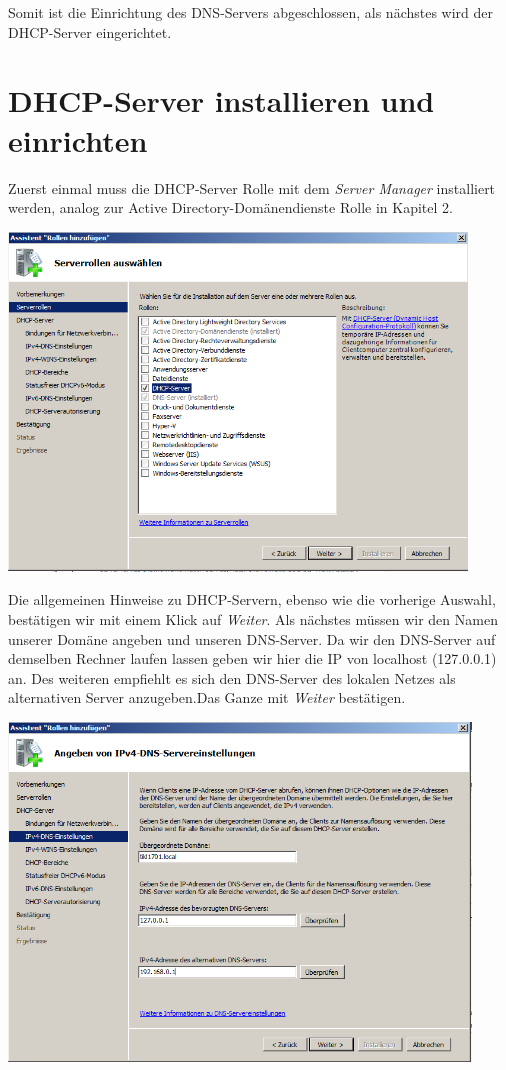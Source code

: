 \documentclass[12pt,a4paper,titlepage]{scrartcl} %
\begin{document}
Somit ist die Einrichtung des DNS-Servers abgeschlossen, als nächstes wird der DHCP-Server eingerichtet.

\newpage
\section{DHCP-Server installieren und einrichten}
Zuerst einmal muss die DHCP-Server Rolle mit dem \emph{Server Manager} installiert werden, analog zur Active Directory-Domänendienste Rolle in Kapitel 2.\\

	\begin{center}\includegraphics[height=9cm]{Bilder/039(DHCP01)}\\ \end{center}

Die allgemeinen Hinweise zu DHCP-Servern, ebenso wie die vorherige Auswahl, bestätigen wir mit einem Klick auf \emph{Weiter}. Als nächstes müssen wir den Namen unserer Domäne angeben und unseren DNS-Server. Da wir den DNS-Server auf demselben Rechner laufen lassen geben wir hier die IP von localhost (127.0.0.1) an. Des weiteren empfiehlt es sich den DNS-Server des lokalen Netzes als alternativen Server anzugeben.Das Ganze mit \emph{Weiter} bestätigen.\\

	\begin{center}\includegraphics[height=9cm]{Bilder/041(DHCP03)}\\ \end{center}
	
\end{document}
